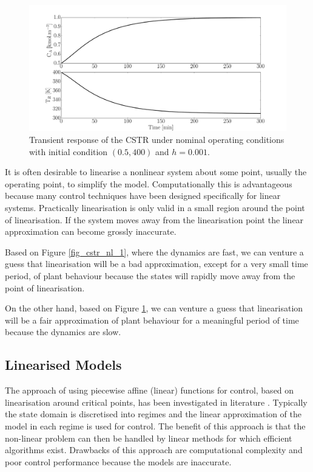 \documentclass[../masters.tex]{subfiles}
\begin{document}
\begin{figure}[H] 
\centering
\includegraphics[scale=0.3]{cstr_nl_2.pdf}
\caption{Transient response of the CSTR under nominal operating conditions with initial condition $(0.5, 400)$ and $h=0.001$.}
\label{fig_cstr_nl_2}
\end{figure}
It is often desirable to linearise a nonlinear system about some point, usually the operating point, to simplify the model. Computationally this is advantageous because many control techniques have been designed specifically for linear systems. Practically linearisation is only valid in a small region around the point of linearisation. If the system moves away from the linearisation point the linear approximation can become grossly inaccurate. 

Based on Figure \ref{fig_cstr_nl_1}, where the dynamics are fast, we can venture a guess that linearisation will be a bad approximation, except for a very small time period, of plant behaviour because the states will rapidly move away from the point of linearisation.

On the other hand, based on Figure \ref{fig_cstr_nl_2}, we can venture a guess that linearisation will be a fair approximation of plant behaviour for a meaningful period of time because the dynamics are slow.

\subsection{Linearised Models}
The approach of using piecewise affine (linear) functions for control, based on linearisation around critical points, has been investigated in literature \cite{du}\cite{kvasnica}. Typically the state domain is discretised into regimes and the linear approximation of the model in each regime is used for control. The benefit of this approach is that the non-linear problem  can then be handled by linear methods for which efficient algorithms exist. Drawbacks of this approach are computational complexity \cite{du} and poor control performance because the models are inaccurate.
\end{document}
